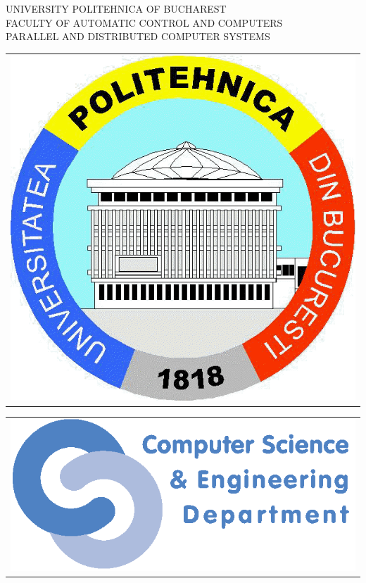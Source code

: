 \thispagestyle{empty}
\begin{center}
\large
UNIVERSITY POLITEHNICA OF BUCHAREST \\
FACULTY OF AUTOMATIC CONTROL AND COMPUTERS \\
PARALLEL AND DISTRIBUTED COMPUTER SYSTEMS \\

\begin{tabular}[t]{@{}l}
	\includegraphics[scale=0.16]{images/logo-upb.png}
\end{tabular}
\hfill
\begin{tabular}[t]{l@{}}
	\includegraphics[scale=0.3]{images/logo-acs.png}
\end{tabular}
\vfill\noindent


\end{center}
